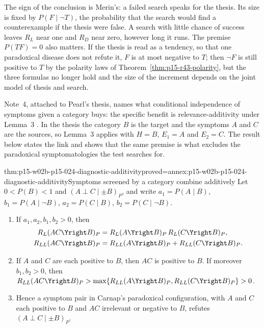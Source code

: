 The sign of the conclusion is Merin's: a failed search speaks for the
thesis. Its size is fixed by \(P(F\mid\neg T)\), the probability that
the search would find a counterexample if the thesis were false. A
search with little chance of success leaves \(R_L\) near one and
\(R_D\) near zero, however long it runs. The premise \(P(TF)=0\) also
matters. If the thesis is read as a tendency, so that one paradoxical
disease does not refute it, \(F\) is at most negative to \(T\); then
\(\neg F\) is still positive to \(T\) by the polarity laws of
Theorem~\ref{thm:p15-r43-polarity}, but the three formulas no longer
hold and the size of the increment depends on the joint model of
thesis and search.

Note~4, attached to Pearl's thesis, names what conditional independence
of symptoms given a category buys: the specific benefit is
relevance-additivity under Lemma~3 \cite[p.~267 and p.~274,
n.~4]{Merin2021Relevance}. In the thesis the category \(B\) is the
target and the symptoms \(A\) and \(C\) are the sources, so Lemma~3
applies with \(H=B\), \(E_1=A\) and \(E_2=C\). The result below states
the link and shows that the same premise is what excludes the
paradoxical symptomatologies the test searches for.

\begin{hbtheorem}{thm:p15-w02b-p15-024-diagnostic-additivity}{proved=annex:p15-w02b-p15-024-diagnostic-additivity}{Symptoms screened by a category combine additively}
Let \(0<P(B)<1\) and \((A\perp C\mid\pm B)_P\), and write
\(a_1=P(A\mid B)\), \(b_1=P(A\mid\neg B)\), \(a_2=P(C\mid B)\),
\(b_2=P(C\mid\neg B)\).
\begin{enumerate}
\item If \(a_1,a_2,b_1,b_2>0\), then
  \[
   \begin{aligned}
   R_L(AC\Yright B)_P&=R_L(A\Yright B)_P\,R_L(C\Yright B)_P,\\
   R_{LL}(AC\Yright B)_P&=R_{LL}(A\Yright B)_P+R_{LL}(C\Yright B)_P .
   \end{aligned}
  \]
\item If \(A\) and \(C\) are each positive to \(B\), then \(AC\) is
  positive to \(B\). If moreover \(b_1,b_2>0\), then
  \(R_{LL}(AC\Yright B)_P>\max\{R_{LL}(A\Yright B)_P,R_{LL}(C\Yright B)_P\}>0\).
\item Hence a symptom pair in Carnap's paradoxical configuration, with
  \(A\) and \(C\) each positive to \(B\) and \(AC\) irrelevant or
  negative to \(B\), refutes \((A\perp C\mid\pm B)_P\).
\end{enumerate}
\end{hbtheorem}

